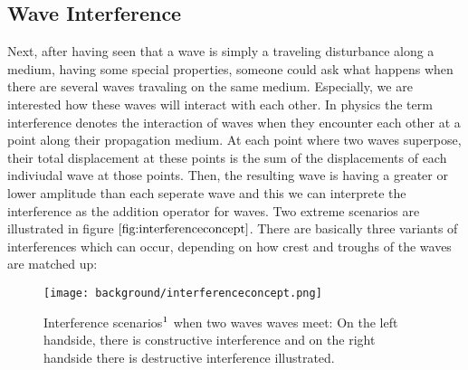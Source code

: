 \subsection{Wave Interference}
Next, after having seen that a wave is simply a traveling disturbance along a medium, having some special properties, someone could ask what happens when there are several waves travaling on the same medium. Especially, we are interested how these waves will interact with each other. In physics the term interference denotes the interaction of waves when they encounter each other at a point along their propagation medium. At each point where two waves superpose, their total displacement at these points is the sum of the displacements of each indiviudal wave at those points. Then, the resulting wave is having a greater or lower amplitude than each seperate wave and this we can interprete the interference as the addition operator for waves. Two extreme scenarios are illustrated in figure $\ref{fig:interferenceconcept}$. There are basically three variants of interferences which can occur, depending on how crest and troughs of the waves are matched up:

\begin{figure}[H]
  \centering
  \texttt{[image: background/interferenceconcept.png]}
  \caption[interference]{Interference scenarios$\footnotemark$ when two waves waves meet: On the left handside, there is constructive interference and on the right handside there is destructive interference illustrated.}
  \label{fig:interferenceconcept}
\end{figure}

